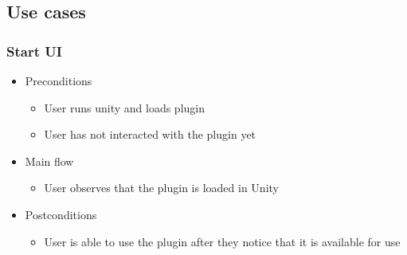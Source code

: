 \subsection{Use cases}
\subsubsection{Start UI}
    \begin{itemize}
    \item Preconditions
        \begin{itemize}
            \item User runs unity and loads plugin
            \item User has not interacted with the plugin yet
        \end{itemize}
    \end{itemize}
    \begin{itemize}
        \item Main flow
        \begin{itemize}
            \item User observes that the plugin is loaded in Unity
        \end{itemize}
    \end{itemize}
    \begin{itemize}
        \item Postconditions
        \begin{itemize}
            \item User is able to use the plugin after they notice that it is available for use
        \end{itemize}
    \end{itemize}

